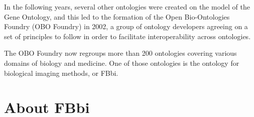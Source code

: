 \begin{frame}
{  In the following years, several other ontologies were created on the
  model of the Gene Ontology, and this led to the formation of the Open
  Bio-Ontologies Foundry (OBO Foundry) in 2002, a group of ontology
  developers agreeing on a set of principles to follow in order to
  facilitate interoperability across ontologies.

  The OBO Foundry now regroups more than 200 ontologies covering various
  domains of biology and medicine. One of those ontologies is the
  ontology for biological imaging methods, or FBbi.}
\end{frame}


\section{About FBbi}

